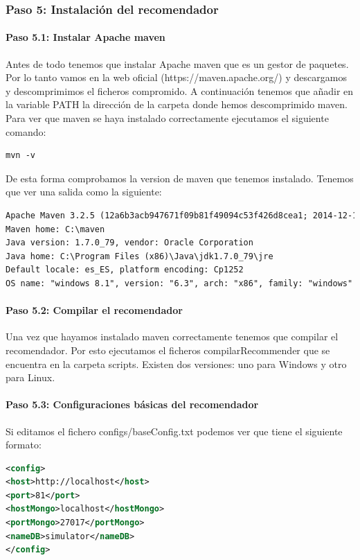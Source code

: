 \subsubsection{Paso 5: Instalación del recomendador}

\paragraph{Paso 5.1: Instalar Apache maven}

Antes de todo tenemos que instalar Apache maven que es un gestor de paquetes. Por lo tanto vamos en la web oficial (https://maven.apache.org/) y descargamos y descomprimimos el ficheros compromido. A continuación tenemos que añadir en la variable PATH la dirección de la carpeta donde hemos descomprimido maven. Para ver que maven se haya instalado correctamente ejecutamos el siguiente comando:
\begin{lstlisting}[language=xml, frame=single]
mvn -v
\end{lstlisting}
De esta forma comprobamos la version de maven que tenemos instalado. Tenemos que ver una salida como la siguiente: \newline

\begin{lstlisting}[language=xml, frame=single]
Apache Maven 3.2.5 (12a6b3acb947671f09b81f49094c53f426d8cea1; 2014-12-14T18:29:23+01:00)
Maven home: C:\maven
Java version: 1.7.0_79, vendor: Oracle Corporation
Java home: C:\Program Files (x86)\Java\jdk1.7.0_79\jre
Default locale: es_ES, platform encoding: Cp1252
OS name: "windows 8.1", version: "6.3", arch: "x86", family: "windows"
\end{lstlisting}

\paragraph{Paso 5.2: Compilar el recomendador}

Una vez que hayamos instalado maven correctamente tenemos que compilar el recomendador. Por esto ejecutamos el ficheros compilarRecommender que se encuentra en la carpeta scripts. Existen dos versiones: uno para Windows y otro para Linux.

\paragraph{Paso 5.3: Configuraciones básicas del recomendador}

Si editamos el fichero configs/baseConfig.txt podemos ver que tiene el siguiente formato:
\begin{lstlisting}[language=xml, frame=single]
<config>
<host>http://localhost</host>
<port>81</port> 
<hostMongo>localhost</hostMongo>
<portMongo>27017</portMongo> 
<nameDB>simulator</nameDB> 
</config>
\end{lstlisting}

